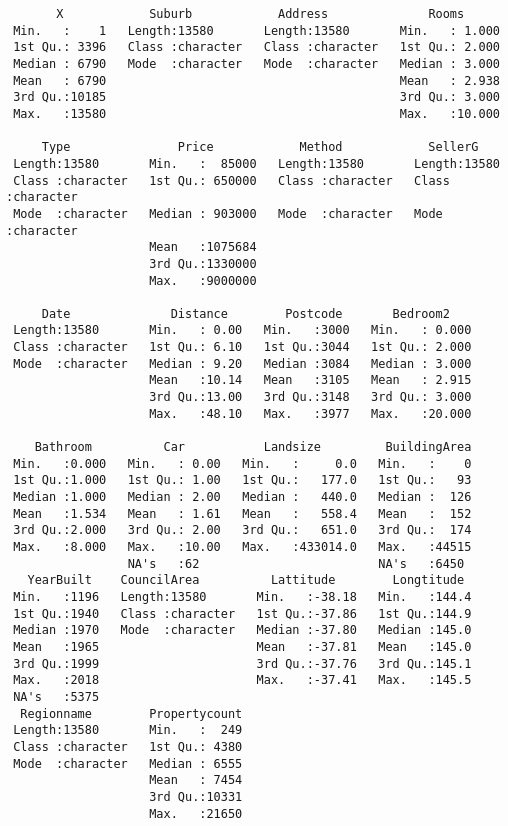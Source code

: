 \documentclass[
  letterpaper,
  DIV=11,
  numbers=noendperiod]{scrartcl}
\begin{document}
\begin{verbatim}
       X            Suburb            Address              Rooms       
 Min.   :    1   Length:13580       Length:13580       Min.   : 1.000  
 1st Qu.: 3396   Class :character   Class :character   1st Qu.: 2.000  
 Median : 6790   Mode  :character   Mode  :character   Median : 3.000  
 Mean   : 6790                                         Mean   : 2.938  
 3rd Qu.:10185                                         3rd Qu.: 3.000  
 Max.   :13580                                         Max.   :10.000  
                                                                       
     Type               Price            Method            SellerG         
 Length:13580       Min.   :  85000   Length:13580       Length:13580      
 Class :character   1st Qu.: 650000   Class :character   Class :character  
 Mode  :character   Median : 903000   Mode  :character   Mode  :character  
                    Mean   :1075684                                        
                    3rd Qu.:1330000                                        
                    Max.   :9000000                                        
                                                                           
     Date              Distance        Postcode       Bedroom2     
 Length:13580       Min.   : 0.00   Min.   :3000   Min.   : 0.000  
 Class :character   1st Qu.: 6.10   1st Qu.:3044   1st Qu.: 2.000  
 Mode  :character   Median : 9.20   Median :3084   Median : 3.000  
                    Mean   :10.14   Mean   :3105   Mean   : 2.915  
                    3rd Qu.:13.00   3rd Qu.:3148   3rd Qu.: 3.000  
                    Max.   :48.10   Max.   :3977   Max.   :20.000  
                                                                   
    Bathroom          Car           Landsize         BuildingArea  
 Min.   :0.000   Min.   : 0.00   Min.   :     0.0   Min.   :    0  
 1st Qu.:1.000   1st Qu.: 1.00   1st Qu.:   177.0   1st Qu.:   93  
 Median :1.000   Median : 2.00   Median :   440.0   Median :  126  
 Mean   :1.534   Mean   : 1.61   Mean   :   558.4   Mean   :  152  
 3rd Qu.:2.000   3rd Qu.: 2.00   3rd Qu.:   651.0   3rd Qu.:  174  
 Max.   :8.000   Max.   :10.00   Max.   :433014.0   Max.   :44515  
                 NA's   :62                         NA's   :6450   
   YearBuilt    CouncilArea          Lattitude        Longtitude   
 Min.   :1196   Length:13580       Min.   :-38.18   Min.   :144.4  
 1st Qu.:1940   Class :character   1st Qu.:-37.86   1st Qu.:144.9  
 Median :1970   Mode  :character   Median :-37.80   Median :145.0  
 Mean   :1965                      Mean   :-37.81   Mean   :145.0  
 3rd Qu.:1999                      3rd Qu.:-37.76   3rd Qu.:145.1  
 Max.   :2018                      Max.   :-37.41   Max.   :145.5  
 NA's   :5375                                                      
  Regionname        Propertycount  
 Length:13580       Min.   :  249  
 Class :character   1st Qu.: 4380  
 Mode  :character   Median : 6555  
                    Mean   : 7454  
                    3rd Qu.:10331  
                    Max.   :21650  
                                   

\end{verbatim}
\end{document}
